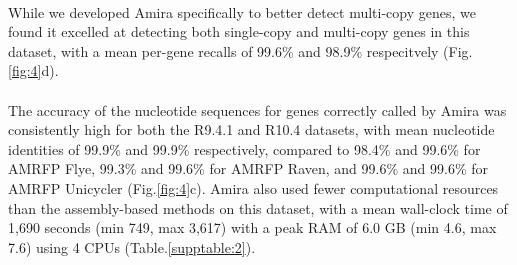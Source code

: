 \paragraph{}
While we developed Amira specifically to better detect multi-copy genes, we found it excelled at detecting both single-copy and multi-copy genes in this dataset, with a mean per-gene recalls of 99.6\% and 98.9\% respecitvely (Fig.\ref{fig:4}d).
\paragraph{}
The accuracy of the nucleotide sequences for genes correctly called by Amira was consistently high for both the R9.4.1 and R10.4 datasets, with mean nucleotide identities of 99.9\% and 99.9\% respectively, compared to 98.4\% and 99.6\% for AMRFP Flye, 99.3\% and 99.6\% for AMRFP Raven, and 99.6\% and 99.6\% for AMRFP Unicycler (Fig.\ref{fig:4}c). Amira also used fewer computational resources than the assembly-based methods on this dataset, with a mean wall-clock time of 1,690 seconds (min 749, max 3,617) with a peak RAM of 6.0 GB (min 4.6, max 7.6) using 4 CPUs (Table.\ref{supptable:2}). 

